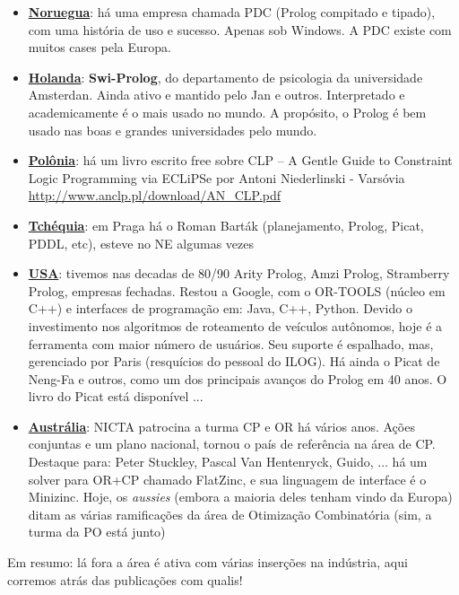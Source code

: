 \documentclass{beamer}
\begin{document}
\begin{frame}[fragile, allowframebreaks=0.85]
\begin{itemize}
    \item {\underline{\bf Noruegua}}: há uma empresa chamada PDC (Prolog compitado e tipado), com uma história de uso e sucesso. Apenas sob Windows. A PDC existe com muitos cases pela Europa.
    
    \item {\underline{\bf Holanda}}: {\bf Swi-Prolog}, do departamento de psicologia da universidade Amsterdan. Ainda ativo e mantido pelo Jan e outros. Interpretado e academicamente é o mais usado no mundo. A propósito, o Prolog é bem usado nas boas e grandes universidades pelo mundo.

   \item {\underline{\bf Polônia}}: há um livro escrito free sobre CLP -- A Gentle Guide to
Constraint Logic Programming via ECLiPSe por Antoni Niederlinski - Varsóvia
   \url{http://www.anclp.pl/download/AN_CLP.pdf}
   
   \item {\underline{\bf Tchéquia}}: em Praga há o Roman Barták (planejamento, Prolog, Picat, PDDL, etc), esteve  no NE algumas vezes

   \item {\underline{\bf USA}}: tivemos nas decadas de 80/90 Arity Prolog, Amzi Prolog, Stramberry Prolog, empresas fechadas. Restou a Google, com o OR-TOOLS (núcleo em C++) e interfaces de programação em: Java, C++, Python. Devido o investimento nos algoritmos de roteamento de veículos autônomos, hoje é a ferramenta com maior número de usuários. Seu suporte é espalhado, mas, gerenciado por Paris (resquícios do pessoal do ILOG). Há ainda o Picat de Neng-Fa e outros, como um dos principais avanços do Prolog em 40 anos. O livro do Picat está disponível ...
   
   
   \item {\underline{\bf Austrália}}: NICTA patrocina a turma CP e OR há vários anos. Ações conjuntas e um plano nacional, tornou o país de referência na área de CP. Destaque para: Peter Stuckley, Pascal Van Hentenryck, Guido, ... há um solver para OR+CP chamado FlatZinc, e sua linguagem de interface é o Minizinc.
   Hoje, os {\em aussies} (embora a maioria deles tenham vindo da Europa) ditam as várias ramificações da área de Otimização Combinatória (sim, a turma da PO está junto)
   
\end{itemize}

Em resumo: lá fora a área é ativa com várias inserções na indústria, aqui corremos atrás das publicações com qualis!

\end{frame}
\end{document}
